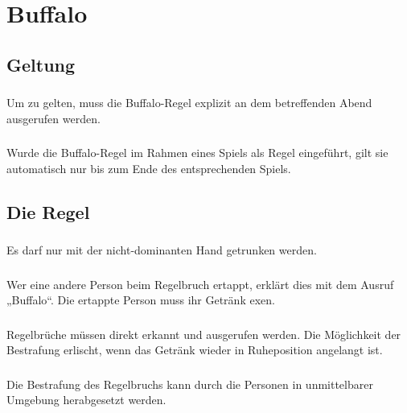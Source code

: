 \section{Buffalo}
\subsection{Geltung}
\subsubsection{}
Um zu gelten, muss die Buffalo-Regel explizit an dem betreffenden Abend ausgerufen werden.

\subsubsection{}
Wurde die Buffalo-Regel im Rahmen eines Spiels als Regel eingeführt, gilt sie automatisch nur bis zum Ende des entsprechenden Spiels.

\subsection{Die Regel}
\subsubsection{}
Es darf nur mit der nicht-dominanten Hand getrunken werden.

\subsubsection{}
Wer eine andere Person beim Regelbruch ertappt, erklärt dies mit dem Ausruf „Buffalo“.
Die ertappte Person muss ihr Getränk exen.

\subsubsection{}
Regelbrüche müssen direkt erkannt und ausgerufen werden.
Die Möglichkeit der Bestrafung erlischt, wenn das Getränk wieder in Ruheposition angelangt ist.

\subsubsection{}
Die Bestrafung des Regelbruchs kann durch die Personen in unmittelbarer Umgebung herabgesetzt werden.
